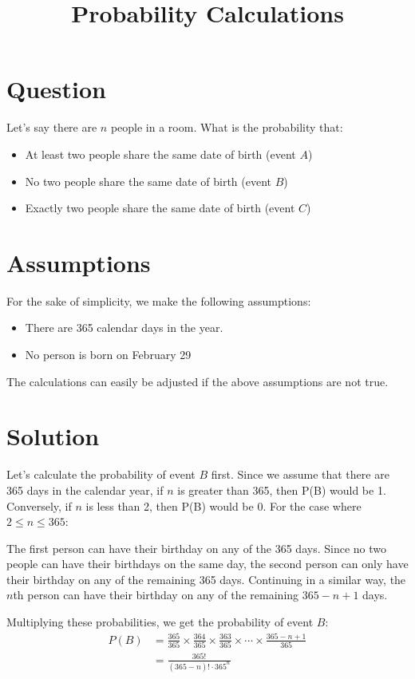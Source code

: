 \documentclass{article}
\title{Probability Calculations \vspace{-3em}}
\date{}
\author{}
\begin{document}
\maketitle

\section{Question}
Let's say there are $n$ people in a room. What is the probability that:
    \begin{itemize}
        \item At least two people share the same date of birth (event $A$)
        \item No two people share the same date of birth (event $B$)
        \item Exactly two people share the same date of birth (event $C$)
    \end{itemize}

\section{Assumptions}
For the sake of simplicity, we make the following assumptions:
    \begin{itemize}
        \item There are 365 calendar days in the year.
        \item No person is born on February 29
    \end{itemize}
The calculations can easily be adjusted if the above assumptions are not true.

\section{Solution}
Let's calculate the probability of event $B$ first. Since we assume that there are 365 days in the calendar year, if $n$ is greater than 365, then P(B) would be 1. Conversely, if $n$ is less than 2, then P(B) would be 0. For the case where $2 \leq n \le 365$:

\noindent The first person can have their birthday on any of the 365 days. Since no two people can have their birthdays on the same day, the second person can only have their birthday on any of the remaining 365 days. Continuing in a similar way, the $n$th person can have their birthday on any of the remaining $365 - n + 1$ days.

\noindent Multiplying these probabilities, we get the probability of event $B$:
\begin{align}
    P(B) & = \frac{365}{365} \times \frac{364}{365} \times \frac{363}{365} \times \cdots \times \frac{365 - n + 1}{365} \nonumber \\
         & = \frac{365!}{(365 - n)! \cdot 365^{n}} \nonumber
\end{align}
\end{document}
